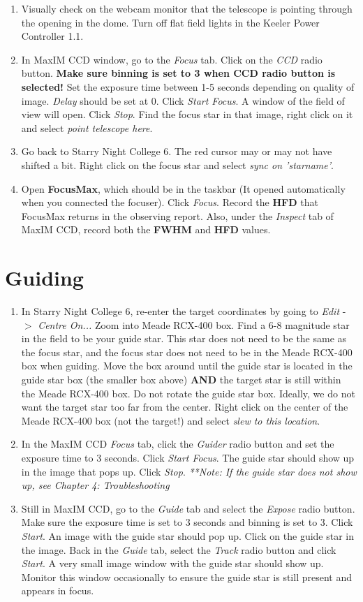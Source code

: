 \documentclass[11pt]{report}
\begin{document}
\begin{enumerate}
\item Visually check on the webcam monitor that the telescope is pointing through the opening in the dome. Turn off flat field lights in the Keeler Power Controller 1.1.
\item In MaxIM CCD window, go to the \emph{Focus} tab. Click on the \emph{CCD} radio button. {\bf Make sure binning is set to 3 when CCD radio button is selected!} Set the exposure time between 1-5 seconds depending on quality of image. \emph{Delay} should be set at 0. Click \emph{Start Focus}. A window of the field of view will open. Click \emph{Stop}. Find the focus star in that image, right click on it and select \emph{point telescope here}.
\item Go back to Starry Night College 6.  The red cursor may or may not have shifted a bit. Right click on the focus star and select \emph{sync on 'starname'}. 
\item Open {\bf FocusMax}, which should be in the taskbar (It opened automatically when you connected the focuser). Click \emph{Focus}. Record the {\bf HFD} that FocusMax returns in the observing report. Also, under the \emph{Inspect} tab of MaxIM CCD, record both the {\bf FWHM} and {\bf HFD} values. 
\end{enumerate}

\section{Guiding}

\begin{enumerate}
\item In Starry Night College 6, re-enter the target coordinates by going to \emph{Edit} -{$>$} \emph{Centre On...} Zoom into Meade RCX-400 box. Find a 6-8 magnitude star in the field to be your guide star. This star does not need to be the same as the focus star, and the focus star does not need to be in the Meade RCX-400 box when guiding. Move the box around until the guide star is located in the guide star box (the smaller box above)  {\bf AND} the target star is still within the Meade RCX-400 box. Do not rotate the guide star box. Ideally, we do not want the target star too far from the center. Right click on the center of the Meade RCX-400 box (not the target!) and select \emph{slew to this location}.
\item In the MaxIM CCD \emph{Focus} tab, click the \emph{Guider} radio button and set the exposure time to 3 seconds. Click \emph{Start Focus}. The guide star should show up in the image that pops up. Click \emph{Stop}. \emph{**Note: If the guide star does not show up, see Chapter 4: Troubleshooting}
\item Still in MaxIM CCD, go to the \emph{Guide} tab and select the \emph{Expose} radio button. Make sure the exposure time is set to 3 seconds and binning is set to 3. Click \emph{Start}. An image with the guide star should pop up. Click on the guide star in the image. Back in the \emph{Guide} tab, select the \emph{Track} radio button and click \emph{Start}. A very small image window with the guide star should show up. Monitor this window occasionally to ensure the guide star is still present and appears in focus. 
\end{enumerate}
\end{document}
